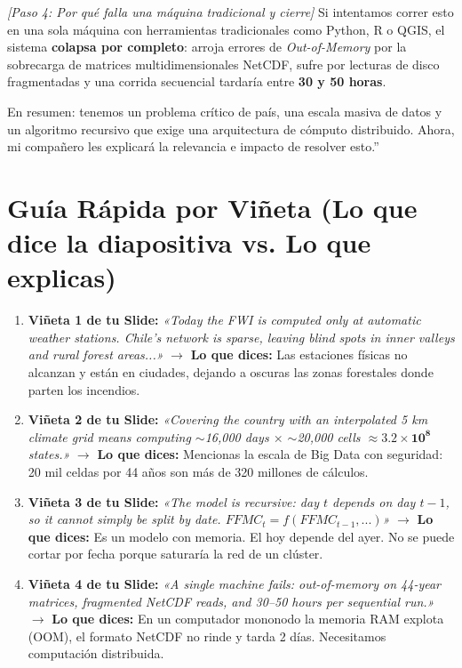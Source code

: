 \documentclass[12pt,a4paper]{article}
\begin{document}
\begin{speechbox}
\vspace{0.3cm}
\noindent \textit{[Paso 4: Por qué falla una máquina tradicional y cierre]}  
\noindent Si intentamos correr esto en una sola máquina con herramientas tradicionales como Python, R o QGIS, el sistema \textbf{colapsa por completo}: arroja errores de \textit{Out-of-Memory} por la sobrecarga de matrices multidimensionales NetCDF, sufre por lecturas de disco fragmentadas y una corrida secuencial tardaría entre \textbf{30 y 50 horas}.

\vspace{0.3cm}
\noindent En resumen: tenemos un problema crítico de país, una escala masiva de datos y un algoritmo recursivo que exige una arquitectura de cómputo distribuido. Ahora, mi compañero les explicará la relevancia e impacto de resolver esto.''
\end{speechbox}

\newpage

\section{Guía Rápida por Viñeta (Lo que dice la diapositiva vs. Lo que explicas)}

\begin{enumerate}[leftmargin=6mm, itemsep=10pt]
    \item \textbf{Viñeta 1 de tu Slide:}  
    \textit{«Today the FWI is computed only at automatic weather stations. Chile's network is sparse, leaving blind spots in inner valleys and rural forest areas...»}  
    $\to$ \textbf{Lo que dices:} Las estaciones físicas no alcanzan y están en ciudades, dejando a oscuras las zonas forestales donde parten los incendios.

    \item \textbf{Viñeta 2 de tu Slide:}  
    \textit{«Covering the country with an interpolated 5 km climate grid means computing $\sim$16,000 days $\times$ $\sim$20,000 cells $\approx \mathbf{3.2 \times 10^{8}}$ states.»}  
    $\to$ \textbf{Lo que dices:} Mencionas la escala de Big Data con seguridad: 20 mil celdas por 44 años son más de 320 millones de cálculos.

    \item \textbf{Viñeta 3 de tu Slide:}  
    \textit{«The model is recursive: day $t$ depends on day $t-1$, so it cannot simply be split by date. $FFMC_t = f(FFMC_{t-1}, ...)$»}  
    $\to$ \textbf{Lo que dices:} Es un modelo con memoria. El hoy depende del ayer. No se puede cortar por fecha porque saturaría la red de un clúster.

    \item \textbf{Viñeta 4 de tu Slide:}  
    \textit{«A single machine fails: out-of-memory on 44-year matrices, fragmented NetCDF reads, and 30--50 hours per sequential run.»}  
    $\to$ \textbf{Lo que dices:} En un computador mononodo la memoria RAM explota (OOM), el formato NetCDF no rinde y tarda 2 días. Necesitamos computación distribuida.
\end{enumerate}
\end{document}
